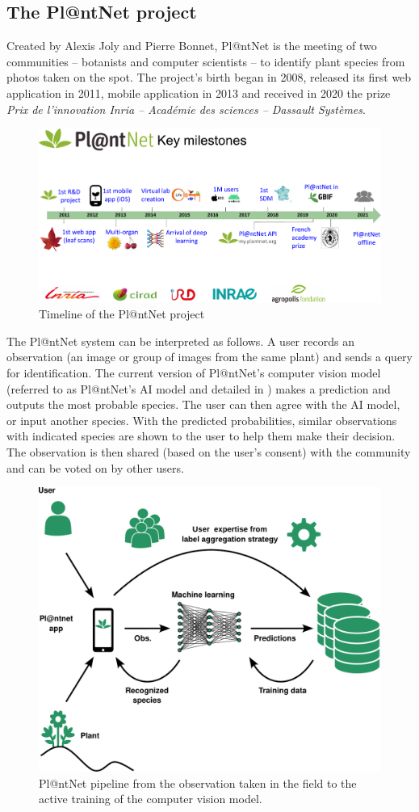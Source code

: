 \subsection{The Pl@ntNet project}
Created by Alexis Joly and Pierre Bonnet, Pl@ntNet \citep{plantet} is the meeting of two communities -- botanists and computer scientists -- to identify plant species from photos taken on the spot.
The project's birth began in 2008, released its first web application in 2011, mobile application in 2013 and received in 2020 the prize \emph{Prix de l’innovation Inria – Académie des sciences – Dassault Systèmes}.
\begin{figure}[tbh]
    \centering
    \includegraphics[width=.8\textwidth, clip, trim={0cm 0cm 0cm 2.5cm}]{chapters/images/Pl@ntNet-overview-Janv-2022.pdf}
    \caption{Timeline of the Pl@ntNet project}
    \label{fig:timeline-plantnet}
\end{figure}

The Pl@ntNet system can be interpreted as follows. A user records an observation (an image or group of images from the same plant) and sends a query for identification.
The current version of Pl@ntNet's computer vision model (referred to as Pl@ntNet's AI model and detailed in ) makes a prediction and outputs the most probable species.
The user can then agree with the AI model, or input another species.
With the predicted probabilities, similar observations with indicated species are shown to the user to help them make their decision.
The observation is then shared (based on the user's consent) with the community and can be voted on by other users.

\begin{figure}[htb]
    \centering
    \includegraphics[width=.65\textwidth]{chapters/images/plantnet_schema_global_green.pdf}
    \caption{Pl@ntNet pipeline from the observation taken in the field to the active training of the computer vision model.}
    \label{fig:pipeline-plantnet}
\end{figure}


